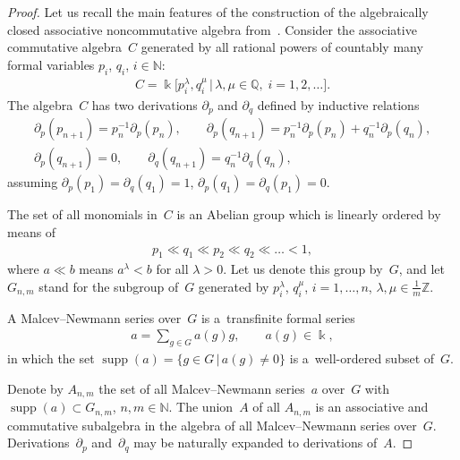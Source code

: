 \documentclass[11pt]{article}
\DeclareMathOperator{\supp}{supp}
\begin{document}
\begin{proof}
Let us recall the main features of the construction of the algebraically closed associative noncommutative algebra
from~\cite{LML85}.
Consider the associative commutative algebra~$C$ generated by all rational powers of countably many formal variables
$p_i$, $q_i$, $i\in \mathbb N$:
\begin{gather*}
C = \Bbbk\big[p_i^\lambda, q_i^\mu \,\big|\, \lambda,\mu\in \mathbb Q,\; i=1,2,\dots\big].
\end{gather*}
The algebra~$C$ has two derivations $\partial_p$ and $\partial_q$ def\/ined by inductive relations
\begin{gather*}
\partial_p(p_{n+1}) = p_n^{-1}\partial_p(p_n),
\qquad
\partial_p(q_{n+1}) = p_n^{-1}\partial_p(p_n) + q_n^{-1}\partial_p(q_n),
\\
\partial_p(q_{n+1}) = 0,
\qquad
\partial_q(q_{n+1}) = q_n^{-1}\partial_q(q_n),
\end{gather*}
assuming $\partial_p(p_1)=\partial_q(q_1)=1$, $\partial_p(q_1)=\partial_q(p_1)=0$.

The set of all monomials in~$C$ is an Abelian group which is linearly ordered by means of
\begin{gather*}
p_1 \ll q_1 \ll p_2 \ll q_2 \ll \dots <1,
\end{gather*}
where $a\ll b$ means $a^\lambda <b$ for all $\lambda >0$.
Let us denote this group by~$G$, and let $G_{n,m}$ stand for the subgroup of~$G$ generated by $ p_i^\lambda $, $q_i^\mu
$, $i=1,\dots, n$, $\lambda,\mu \in \frac{1}{m}\mathbb Z$.

A Malcev--Newmann series over~$G$ is a~transf\/inite formal series
\begin{gather*}
a = \sum\limits_{g\in G} a(g) g,
\qquad
a(g)\in \Bbbk,
\end{gather*}
in which the set $\supp(a) = \{g\in G\,|\, a(g)\ne 0\}$ is a~well-ordered subset of~$G$.

Denote by $A_{n,m}$ the set of all Malcev--Newmann series~$a$ over~$G$ with $\supp(a)\subset G_{n,m}$, $n,m\in
\mathbb N$.
The union~$A$ of all $A_{n,m}$ is an associative and commutative subalgebra in the algebra of all Malcev--Newmann series
over~$G$.
Derivations~$\partial_p$ and~$\partial_q$ may be naturally expanded to derivations of~$A$.


\end{proof}
\end{document}
